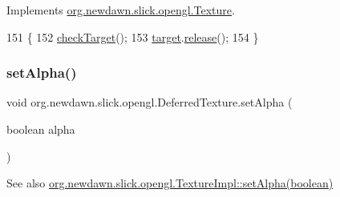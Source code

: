 Implements \mbox{\hyperlink{interfaceorg_1_1newdawn_1_1slick_1_1opengl_1_1_texture_a57d72d7a615be1b481410739479989a6}{org.\+newdawn.\+slick.\+opengl.\+Texture}}.


\begin{DoxyCode}
151                           \{
152         \mbox{\hyperlink{classorg_1_1newdawn_1_1slick_1_1opengl_1_1_deferred_texture_a22f14bcd9cbd4bf033e2308b90464dce}{checkTarget}}();
153         \mbox{\hyperlink{classorg_1_1newdawn_1_1slick_1_1opengl_1_1_deferred_texture_aa70a4b195d0b965a0099d0e7bc18d9d2}{target}}.\mbox{\hyperlink{classorg_1_1newdawn_1_1slick_1_1opengl_1_1_texture_impl_ad039511f5655274072eac9595411d969}{release}}();
154     \}
\end{DoxyCode}
\mbox{\label{classorg_1_1newdawn_1_1slick_1_1opengl_1_1_deferred_texture_ae134ad2586dc408603ac0c4e64c063b7}} 
\subsubsection{\texorpdfstring{set\+Alpha()}{setAlpha()}}
{\footnotesize\ttfamily void org.\+newdawn.\+slick.\+opengl.\+Deferred\+Texture.\+set\+Alpha (\begin{DoxyParamCaption}\item[{boolean}]{alpha }\end{DoxyParamCaption})\hspace{0.3cm}{\ttfamily [inline]}}

\begin{DoxySeeAlso}{See also}
\mbox{\hyperlink{classorg_1_1newdawn_1_1slick_1_1opengl_1_1_texture_impl_a2a99120ac7e938687b55606114ee5e21}{org.\+newdawn.\+slick.\+opengl.\+Texture\+Impl\+::set\+Alpha(boolean)}} 
\end{DoxySeeAlso}

